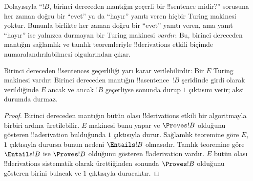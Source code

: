 \begin{explain}
Dolayısıyla ``$!B$, birinci dereceden mantığın geçerli bir !!{sentence} midir?''
sorusuna her zaman doğru bir ``evet'' ya da ``hayır'' yanıtı veren hiçbir
Turing makinesi yoktur. Bununla birlikte her zaman doğru bir ``evet'' yanıtı
veren, ama yanıt ``hayır'' ise yalnızca durmayan bir Turing makinesi
\emph{vardır}. Bu, birinci dereceden mantığın sağlamlık ve tamlık teoremleriyle
!!{derivation}s etkili biçimde numaralandırılabilmesi olgularından çıkar.
\end{explain}

\begin{thm}
  Birinci dereceden !!{sentence}s geçerliliği yarı karar verilebilirdir:
  Bir $E$ Turing makinesi vardır: Birinci dereceden mantığın
  !!a{sentence}~$!B$ şeridinde girdi olarak
  verildiğinde $E$ ancak ve ancak $!B$ geçerliyse sonunda durup $1$ çıktısını
  verir; aksi durumda durmaz.
\end{thm}

\begin{proof}
  Birinci dereceden mantığın bütün olası !!{derivation}s etkili bir
  algoritmayla birbiri ardına üretilebilir. $E$ makinesi bunu yapar ve
  $\Proves !B$ olduğunu gösteren !!a{derivation} bulduğunda $1$ çıktısıyla
  durur. Sağlamlık teoremine göre $E$, $1$ çıktısıyla durursa bunun nedeni
  $\Entails !B$ olmasıdır. Tamlık teoremine göre $\Entails !B$ ise
  $\Proves !B$ olduğunu gösteren !!a{derivation} vardır. $E$ bütün olası
  !!{derivation}s sistematik olarak ürettiğinden sonunda $\Proves !B$
  olduğunu gösteren birini bulacak ve $1$ çıktısıyla duracaktır.
\end{proof}

